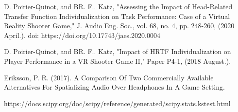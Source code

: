 \documentclass[conference]{IEEEtran}
\begin{document}
\begin{thebibliography}{00}
 D. Poirier-Quinot, and BR. F.. Katz, "Assessing the Impact of Head-Related Transfer Function Individualization on Task Performance: Case of a Virtual Reality Shooter Game," J. Audio Eng. Soc., vol. 68, no. 4, pp. 248-260, (2020 April.). doi: https://doi.org/10.17743/jaes.2020.0004

 D.  Poirier-Quinot, and BR. F..   Katz, "Impact of HRTF Individualization on Player Performance in a VR Shooter Game II," Paper P4-1, (2018 August.).

 Eriksson, P. R. (2017). A Comparison Of Two Commercially Available Alternatives For Spatializing Audio Over Headphones In A Game Setting.

 https://docs.scipy.org/doc/scipy/reference/generated/scipy.stats.kstest.html

\end{thebibliography}
\end{document}
